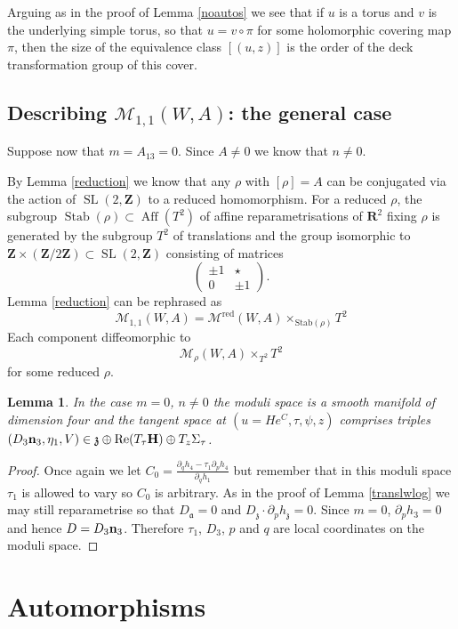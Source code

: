 \documentclass[11pt]{amsart}
\newcommand{\mM}{\mathcal{M}}
\newcommand{\HH}{\mathbf{H}}
\newcommand{\RR}{\mathbf{R}}
\newcommand{\ZZ}{\mathbf{Z}}
\newcommand{\Stab}{\mathrm{Stab}}
\newcommand{\WW}{W}
\renewcommand{\aa}{\mathfrak{a}}
\newcommand{\zz}{\mathfrak{z}}
\newcommand{\OP}{\operatorname}
\numberwithin{equation}{section}
\newtheorem{lma}[equation]{Lemma}
\theoremstyle{definition}
\theoremstyle{remark}
\begin{document}
Arguing as in the proof of Lemma \ref{noautos} we see that if $u$ is a torus and $v$ is the underlying simple torus, so that $u=v\circ\pi$ for some holomorphic covering map $\pi$, then the size of the equivalence class $[(u,z)]$ is the order of the deck transformation group of this cover.

\subsection{Describing $\mM_{1,1}(\WW,A)$: the general case}
Suppose now that $m=A_{13}=0$. Since $A\neq 0$ we know that $n\neq 0$.

By Lemma \ref{reduction} we know that any $\rho$ with $[\rho]=A$ can be conjugated via the action of $\OP{SL}(2,\ZZ)$ to a reduced homomorphism. For a reduced $\rho$, the subgroup $\OP{Stab}(\rho)\subset\OP{Aff}(T^2)$ of affine reparametrisations of $\RR^2$ fixing $\rho$ is generated by the subgroup $T^2$ of translations and the group isomorphic to $\ZZ\times(\ZZ/2\ZZ)\subset\OP{SL}(2,\ZZ)$ consisting of matrices
\[\left(\begin{array}{cc}
\pm 1 & \star\\
0 & \pm 1
\end{array}\right).\]
Lemma \ref{reduction} can be rephrased as
\[\mM_{1,1}(\WW,A)=\mM^{\mathrm{red}}(\WW,A)\times_{\Stab(\rho)}T^2\]
Each component diffeomorphic to
\[\mM_{\rho}(\WW,A)\times_{T^2}T^2\]
for some reduced $\rho$.
\begin{lma}\label{mod-tang2}
In the case $m=0$, $n\neq 0$ the moduli space is a smooth manifold of dimension four and the tangent space at $(u=He^C,\tau,\psi,z)$ comprises triples $(D_3{\bf n}_3,\eta_1,V)\in\zz\oplus\OP{Re}(T_{\tau}\HH)\oplus T_z\Sigma_{\tau}$.
\end{lma}
\begin{proof}
Once again we let $C_0=\frac{\partial_qh_4-\tau_1\partial_ph_4}{\partial_qh_1}$ but remember that in this moduli space $\tau_1$ is allowed to vary so $C_0$ is arbitrary. As in the proof of Lemma \ref{translwlog} we may still reparametrise so that $D_{\aa}=0$ and $D_{\zz}\cdot \partial_ph_{\zz}=0$. Since $m=0$, $\partial_ph_3=0$ and hence $D=D_3{\bf n}_3$. Therefore $\tau_1$, $D_3$, $p$ and $q$ are local coordinates on the moduli space.
\end{proof}

\section{Automorphisms}\label{auto}
\end{document}
